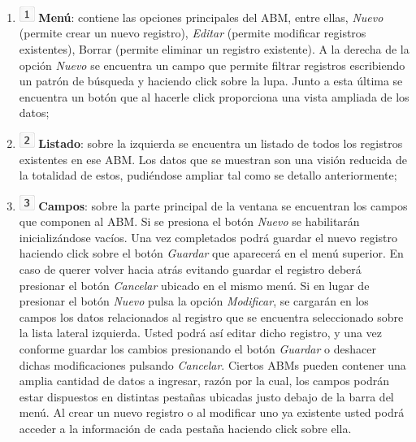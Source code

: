 \documentclass{book}
\begin{document}
\begin{enumerate}
	\itemsep=8pt \topsep=0pt \partopsep=0pt \parskip=0pt \parsep=0pt
	
	\item [] \includegraphics[width=0.5cm]{images/number-1.png} \textbf{Menú}: contiene las opciones principales del ABM, entre ellas, \textit{Nuevo} (permite crear un nuevo registro), \textit{Editar} (permite modificar registros existentes), Borrar (permite eliminar un registro existente). A la derecha de la opción \textit{Nuevo} se encuentra un campo que permite filtrar registros escribiendo un patrón de búsqueda y haciendo click sobre la lupa. Junto a esta última se encuentra un botón que al hacerle click proporciona una vista ampliada de los datos;

	\item [] \includegraphics[width=0.5cm]{images/number-2.png} \textbf{Listado}: sobre la izquierda se encuentra un listado de todos los registros existentes en ese ABM. Los datos que se muestran son una visión reducida de la totalidad de estos, pudiéndose ampliar tal como se detallo anteriormente;

	\item [] \includegraphics[width=0.5cm]{images/number-3.png} \textbf{Campos}: sobre la parte principal de la ventana se encuentran los campos que componen al ABM. Si se presiona el botón \textit{Nuevo} se habilitarán inicializándose vacíos. Una vez completados podrá guardar el nuevo registro haciendo click sobre el botón \textit{Guardar} que aparecerá en el menú superior. En caso de querer volver hacia atrás evitando guardar el registro deberá presionar el botón \textit{Cancelar} ubicado en el mismo menú. Si en lugar de presionar el botón \textit{Nuevo} pulsa la opción \textit{Modificar}, se cargarán en los campos los datos relacionados al registro que se encuentra seleccionado sobre la lista lateral izquierda. Usted podrá así editar dicho registro, y una vez conforme guardar los cambios presionando el botón \textit{Guardar} o deshacer dichas modificaciones pulsando \textit{Cancelar}. Ciertos ABMs pueden contener una amplia cantidad de datos a ingresar, razón por la cual, los campos podrán estar dispuestos en distintas pestañas ubicadas justo debajo de la barra del menú. Al crear un nuevo registro o al modificar uno ya existente usted podrá acceder a la información de cada pestaña haciendo click sobre ella.

\end{enumerate}
\medskip
\end{document}
